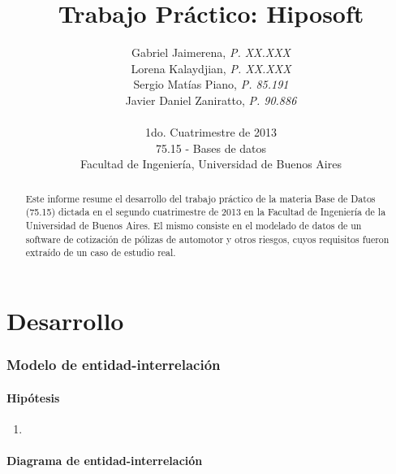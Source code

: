 \documentclass[a4paper,11pt]{article}
\title{\textbf{Trabajo Práctico: Hiposoft}}
\author{
  Gabriel Jaimerena,      \textit{P. XX.XXX}                      \\
  Lorena Kalaydjian,     \textit{P. XX.XXX}                      \\
  Sergio Matías Piano,     \textit{P. 85.191}                      \\
  Javier Daniel Zaniratto, \textit{P. 90.886}                      \\
  \\
  \normalsize{1do. Cuatrimestre de 2013}                           \\
  \normalsize{75.15 - Bases de datos}                              \\
  \normalsize{Facultad de Ingeniería, Universidad de Buenos Aires}
}
\date{}
\begin{document}
\thispagestyle{empty}
\maketitle

\begin{abstract}

  Este informe resume el desarrollo del trabajo práctico de la materia Base
  de Datos (75.15) dictada en el segundo cuatrimestre de 2013 en la Facultad de
  Ingeniería de la Universidad de Buenos Aires. El mismo consiste en el
  modelado de datos de un software de cotización de pólizas de automotor y otros riesgos,
  cuyos requisitos fueron extraído de un caso de estudio real.

\end{abstract}

\clearpage

\tableofcontents
\clearpage


\part{Desarrollo}


\section{Modelo de entidad-interrelación} \label{sec:der}

\subsection{Hipótesis}

\begin{enumerate}

  \item 
  
\end{enumerate}


\subsection{Diagrama de entidad-interrelación}
\end{document}
